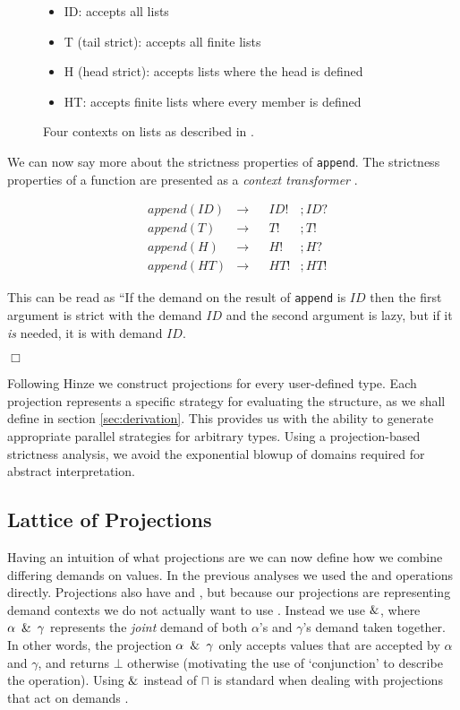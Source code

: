 \begin{figure}[h!]
\begin{itemize}
    \item[] ID: accepts all lists
    \item[] T (tail strict): accepts all finite lists
    \item[] H (head strict): accepts lists where the head is defined
    \item[] HT: accepts finite lists where every member is defined
\end{itemize}
\caption[Projections for the 4-point Domain]{Four contexts on lists as described in \citep{wadler1987projections}.}
\label{contexts}
\end{figure}

We can now say more about the strictness properties of \verb'append'. The
strictness properties of a function are presented as a \emph{context
transformer} \citep{hinze1995projection}. 

\begin{align*}
    &append(ID) &\rightarrow &&ID!&;ID? \\
    &append(T)  &\rightarrow &&T!&;T! \\
    &append(H)  &\rightarrow &&H!&;H? \\
    &append(HT) &\rightarrow &&HT!&;HT!
\end{align*}

This can be read as ``If the demand on the result of \verb-append- is $ID$
then the first argument is strict with the demand $ID$ and the second
argument is lazy, but if it \emph{is} needed, it is with demand $ID$.

\hfill$\Box$

Following Hinze \citep{hinze1995projection} we construct projections
for every user-defined type. Each projection represents a
specific strategy for evaluating the structure, as we shall define in section
\ref{sec:derivation}. This provides us with the ability to generate
appropriate parallel strategies for arbitrary types. Using a
projection-based strictness analysis, we avoid the exponential blowup
of domains required for abstract interpretation.

\subsection{Lattice of Projections}

Having an intuition  of what projections are we can now define how we combine
differing demands on values. In the previous analyses we used the \meet and
\join operations directly. Projections also have \meet and \join, but because
our projections are representing demand contexts we do not actually want to use
\meet. Instead we use $\operatorname{\&}$, where $\alpha\ \operatorname{\&}\ \gamma$ represents the
\emph{joint} demand of both $\alpha$'s and $\gamma$'s demand taken together. In
other words, the projection $\alpha\ \operatorname{\&}\ \gamma$ only accepts values that
are accepted by $\alpha$ and $\gamma$, and returns $\bot$ otherwise (motivating
the use of `conjunction' to describe the operation). Using $\operatorname{\&}$ instead of
$\sqcap$ is standard when dealing with projections that act on demands
\citep{wadler1987projections, hinze1995projection, SergeyDemand}.


